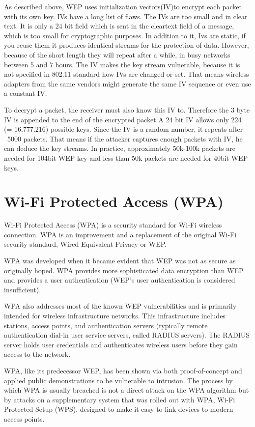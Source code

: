 \documentclass[a4paper,12pt,pagesize,headsepline,bibtotoc,titlepage]{scrartcl}
\begin{document}
As described above,  WEP uses initialization vectors(IV)to encrypt each packet
with its own key.
IVs have a long list of flaws.
The IVs are too small and in clear text. 
It is only a 24 bit field which is sent in the cleartext field of a message, which is too small for cryptographic purposes. 
In addition to it, Ivs are static, if you reuse them it produces identical streams for  the protection of data. However, because of the short length they will repeat after a while, in busy networks between 5 and 7 hours.
The IV makes the key stream vulnerable, because it is not specified in 802.11 standard how IVs are changed or set. That means wireless adapters from the same vendors might generate the same IV sequence or even use a constant IV.

To decrypt a packet, the receiver must also know this IV to.
Therefore the 3 byte IV is appended to the end of the encrypted packet
A 24 bit IV allows only 224 (= 16.777.216) possible keys. Since the IV is a random number, it repeats after ~5000 packets.
That means if the attacker captures enough packets with IV, he can deduce the key streams.
In practice, approximately 50k-100k packets are needed for 104bit WEP key and less than 50k packets are needed  for 40bit WEP keys.

\newpage
\section{Wi-Fi Protected Access (WPA)}


Wi-Fi Protected Access (WPA) is a security standard for Wi-Fi wireless connection. WPA is an improvement and a replacement of the original Wi-Fi security standard, Wired Equivalent Privacy or WEP. 

WPA was developed when it became evident that WEP was not as secure as originally hoped. WPA provides more sophisticated data encryption than WEP and provides a user authentication (WEP's user authentication is considered insufficient).

WPA also addresses most of the known WEP vulnerabilities and is primarily intended for wireless infrastructure networks. This infrastructure includes stations, access points, and authentication servers (typically remote authentication dial-in user service servers, called RADIUS servers). The RADIUS server holds user credentials and authenticates wireless users before they gain access to the network.

WPA, like its predecessor WEP, has been shown via both proof-of-concept and applied public demonstrations to be vulnerable to intrusion. The process by which WPA is usually breached is not a direct attack on the WPA algorithm but by attacks on a supplementary system that was rolled out with WPA, Wi-Fi Protected Setup (WPS), designed to make it easy to link devices to modern access points.
\end{document}
